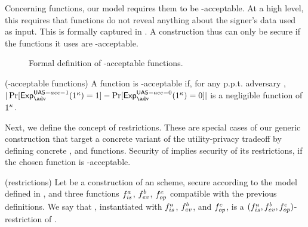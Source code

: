 Concerning \fissue functions, our \UAS model requires them to be
\UAS-acceptable. At a high level, this requires that \fissue functions do not
reveal anything about the signer's data used as input. This is formally captured
in .
%
A \UAS construction thus can only be secure if the \fissue functions it uses
are \UAS-acceptable.

\begin{figure}[ht!]
  \centering  
  \label{fig:uas-acceptable}
  \caption{Formal definition of \UAS-acceptable \fissue functions.}
\end{figure}

\begin{definition}{(\UAS-acceptable \fissue functions)}
  \label{def:uas-acc-func}
  A \fissue function is \UAS-acceptable if, for any p.p.t. adversary \adv,
  $|\Pr[\Exp^{\UAS-acc-1}_\adv(1^\secpar)=1]-\Pr[\Exp^{\UAS-acc-0}_\adv
  (1^\secpar)=0]|$ is a negligible function of $1^\kappa$.
\end{definition}

Next, we define the concept of \CUASGen restrictions. These are special
cases of our generic construction that target a concrete variant of the
utility-privacy tradeoff by defining concrete \fissue, \feval and \finsp
functions. Security of \CUASGen implies security of its restrictions, if
the chosen \fissue function is \CUASGen-acceptable.

\begin{definition}{(\CUASGen restrictions)}
  \label{def:uas-restrictions}
  Let \CUASGen be a construction of an \UAS scheme, secure according to
  the model defined in , and three functions $f_{is}^a$,
  $f_{ev}^b$, $f_{op}^c$ compatible with the previous definitions. We say that
  \CUASGen, instantiated with $f_{is}^a$, $f_{ev}^b$, and $f_{op}^c$, is a
  $(f_{is}^a,f_{ev}^b,f_{op}^c)$-restriction of \CUASGen.
\end{definition}

